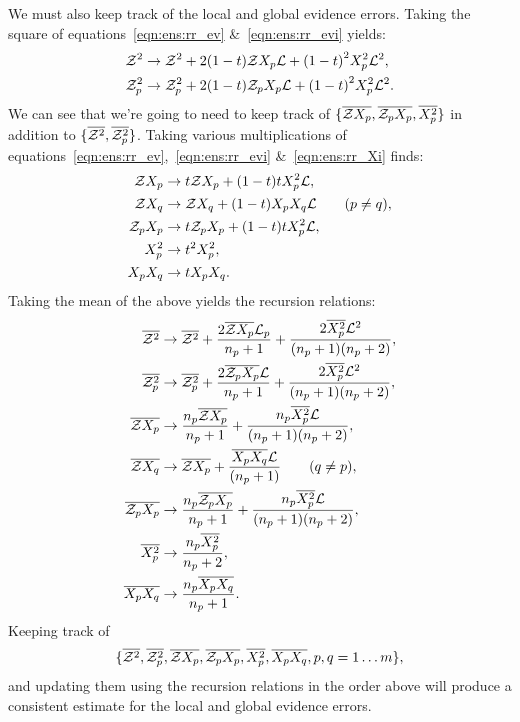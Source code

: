 We must also keep track of the local and global evidence errors. Taking the square of equations~\eqref{eqn:ens:rr_ev} \&~\ref{eqn:ens:rr_evi} yields:
%
\begin{align}
  \mathcal{Z}^2 &\to \mathcal{Z}^2 + 2 (1-t) \mathcal{Z} X_p \mathcal{L} +  {(1-t)}^2 X_p^2 \mathcal{L}^2, \\
  \mathcal{Z}_p^2 &\to \mathcal{Z}_p^2 + 2 (1-t) \mathcal{Z}_p X_p \mathcal{L} +  {(1-t)}^2 X_p^2 \mathcal{L}^2.
\end{align}
%
We can see that we're going to need to keep track of $\{\overline{\mathcal{Z} X_p}, \overline{\mathcal{Z}_p X_p}, \overline{X_p^2}\}$ in addition to $\{ \overline{\mathcal{Z}^2}, \overline{\mathcal{Z}_p^2} \}$. Taking various multiplications of equations~\eqref{eqn:ens:rr_ev},~\ref{eqn:ens:rr_evi} \&~\ref{eqn:ens:rr_Xi} finds:
%
\begin{align}
  \mathcal{Z} X_p   &\to t \mathcal{Z} X_p + (1-t)t X_p^2 \mathcal{L}, \\
  \mathcal{Z} X_q   &\to   \mathcal{Z} X_q + (1-t) X_p X_q \mathcal{L} \qquad (p\ne q),   \\
  \mathcal{Z}_p X_p &\to t \mathcal{Z}_p X_p + (1-t)t X_p^2 \mathcal{L}, \\
  X_p^2     &\to t^2 X_p^2, \\
  X_p X_q   &\to t   X_p X_q.
\end{align}
%
Taking the mean of the above yields the recursion relations:
\begin{align}
  \overline{\mathcal{Z}^2} &\to \overline{\mathcal{Z}^2} + \frac{2\overline{\mathcal{Z} X_p}\mathcal{L}_p}{n_p+1}  + \frac{2\overline{X_p^2}\mathcal{L}^2}{(n_p+1)(n_p+2)}, \\
  \overline{\mathcal{Z}_p^2} &\to \overline{\mathcal{Z}_p^2} + \frac{2\overline{\mathcal{Z}_p X_p}\mathcal{L}}{n_p+1}  + \frac{2\overline{X_p^2}\mathcal{L}^2}{(n_p+1)(n_p+2)}, \\
  \overline{\mathcal{Z} X_p} &\to \frac{n_p\overline{\mathcal{Z} X_p}}{n_p+1}  + \frac{n_p\overline{X_p^2} \mathcal{L}}{(n_p+1)(n_p+2)},   \\
  \overline{\mathcal{Z} X_q} &\to \overline{\mathcal{Z} X_p}  + \frac{\overline{X_p X_q} \mathcal{L}}{(n_p+1)} \qquad (q\ne p),  \\
  \overline{\mathcal{Z}_p X_p} &\to \frac{n_p\overline{\mathcal{Z}_p X_p}}{n_p+1}  + \frac{n_p\overline{X_p^2} \mathcal{L}}{(n_p+1)(n_p+2)},   \\
  \overline{X_p^2} &\to \frac{n_p\overline{X_p^2}}{n_p+2}, \\
  \overline{X_p X_q} &\to \frac{n_p\overline{X_p X_q}}{n_p+1}.
\end{align}
Keeping track of 
\[\{\overline{\mathcal{Z}^2},\overline{\mathcal{Z}_p^2},\overline{\mathcal{Z} X_p},\overline{\mathcal{Z}_p X_p},\overline{X_p^2},\overline{X_p X_q},p,q=1\ldots m\},\]
and updating them using the recursion relations in the order above will produce a consistent estimate for the local and global evidence errors.



